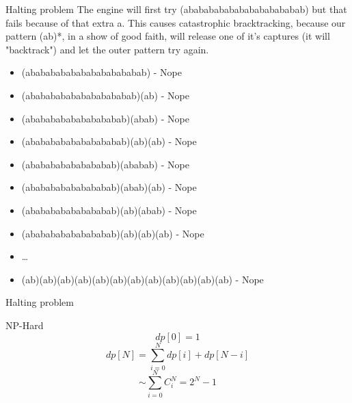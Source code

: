 \documentclass{beamer}
\begin{document}
\begin{CJK*}{UTF8}{bsmi}
    \begin{frame}{Halting problem}
        The engine will first try (abababababababababababab) but that
        fails because of that extra a. This causes catastrophic bracktracking,
        because our pattern (ab)*, in a show of good faith, will release
        one of it's captures (it will "backtrack") and let the outer
        pattern try again.
        \begin{itemize}
            \item (abababababababababababab) - Nope
            \item (ababababababababababab)(ab) - Nope
            \item (abababababababababab)(abab) - Nope
            \item (abababababababababab)(ab)(ab) - Nope
            \item (ababababababababab)(ababab) - Nope
            \item (ababababababababab)(abab)(ab) - Nope
            \item (ababababababababab)(ab)(abab) - Nope
            \item (ababababababababab)(ab)(ab)(ab) - Nope
            \item \dots
            \item (ab)(ab)(ab)(ab)(ab)(ab)(ab)(ab)(ab)(ab)(ab)(ab) - Nope
        \end{itemize}
    \end{frame}

    \begin{frame}{Halting problem}
        \begin{center}
            \LARGE {NP-Hard}
            $$dp[0] = 1$$
            $$dp[N]=\sum^{N}_{i=0}{dp[i] + dp[N-i]} $$
            $$\sim \sum^{N}_{i=0}{C^{N}_{i}} = 2^N -1 $$
        \end{center}
    \end{frame}

\end{CJK*}
\end{document}
